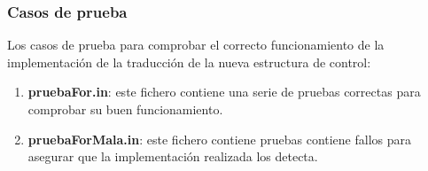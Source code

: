 \documentclass[12pt,a4paper,landscape]{article}
\theoremstyle{mytheor}
\begin{document}
\subsubsection{Casos de prueba}
Los casos de prueba para comprobar el correcto funcionamiento de la implementación de la traducción de la nueva estructura de control:
\begin{enumerate}
\item \textbf{pruebaFor.in}: este fichero contiene una serie de pruebas correctas para comprobar su buen funcionamiento.
\item \textbf{pruebaForMala.in}: este fichero contiene pruebas contiene fallos para asegurar que la implementación realizada los detecta.
\end{enumerate}
\end{document}

